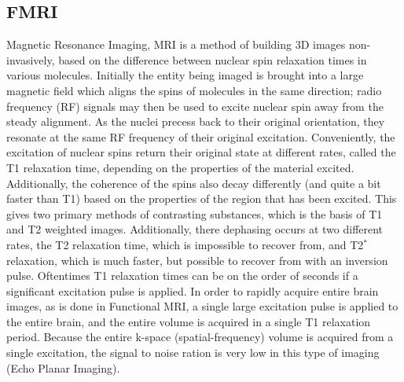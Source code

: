 \documentclass{article}
\begin{document}
\subsection{FMRI}
Magnetic Resonance Imaging, MRI is a method of building 3D images
non-invasively, based on the difference between nuclear spin
relaxation times in various molecules. Initially the entity being
imaged is brought into a large magnetic field which aligns the spins
of molecules in the same direction; radio frequency (RF) signals may
then be used to excite nuclear spin away from the steady alignment. 
As the nuclei precess back to their original orientation, they resonate
at the same RF frequency of their original excitation. Conveniently, the
excitation of nuclear spins return their original state at different
rates, called the T1 relaxation time, depending on the properties of 
the material excited. Additionally, the
coherence of the spins also decay differently (and quite a bit faster
than T1) based on the properties of the region that has been excited.
This gives two primary methods of contrasting substances,
which is the basis of T1 and T2 weighted images. Additionally, there
dephasing occurs at two different rates, the T2 relaxation time,
which is impossible to recover from, and T2$^*$ relaxation, which is
much faster, but possible to recover from with an inversion pulse.
Oftentimes T1 relaxation times can be on the order of seconds if 
a significant excitation pulse is applied. 
In order to rapidly acquire entire brain images, as is done in Functional 
MRI, a single large excitation pulse is applied to the entire brain,
and the entire volume is acquired in a single T1 relaxation period. 
Because the entire k-space (spatial-frequency) volume is acquired 
from a single excitation, the signal to noise ration is very low
in this type  of imaging (Echo Planar Imaging). 
\end{document}
